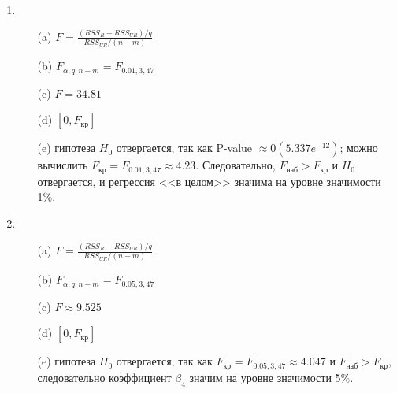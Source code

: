 \documentclass[pdftex,11pt,openany]{book}\usepackage[]{graphicx}\usepackage[]{color}
\begin{document}
\begin{solution}
\begin{enumerate}
\item 
\begin{enumerate}
\item[(a)] $F =\frac{(RSS_R-RSS_{UR})/q}{RSS_{UR}/(n-m)}$
\item[(b)] $F_{\alpha,q,n-m}=F_{0.01,3,47}$
\item[(c)] $F=34.81$
\item[(d)]$[0,F_{\text{кр}}]$
\item[(e)] гипотеза $H_0$ отвергается, так как P-value $\approx 0(5.337e^{-12})$; можно вычислить $F_{\text{кр}}=F_{0.01,3,47} \approx 4.23$. Следовательно, $F_{\text{наб}}>F_{\text{кр}}$ и $H_0$ отвергается, и регрессия <<в целом>> значима на уровне значимости 1\%.
\end{enumerate}

\item 
\begin{enumerate}
\item[(a)] $F =\frac{(RSS_R-RSS_{UR})/q}{RSS_{UR}/(n-m)}$
\item[(b)] $F_{\alpha,q,n-m}=F_{0.05,3,47}$
\item[(c)] $F\approx 9.525$
\item[(d)] $[0,F_{\text{кр}}]$
\item[(e)] гипотеза $H_0$ отвергается, так как $F_{\text{кр}}=F_{0.05,3,47} \approx 4.047$ и $F_{\text{наб}}>F_{\text{кр}}$, следовательно коэффициент $\beta_4$ значим на уровне значимости 5\%.
\end{enumerate}
\end{enumerate}
\end{solution}
\end{document}
